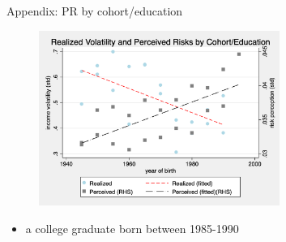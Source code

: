 \documentclass{beamer}
\begin{document}
\begin{frame}{Appendix: PR by cohort/education}
	\begin{figure}[ht]
		\label{appendix2:cohort_edu_compare_figure}
		\centering
		\includegraphics[width=0.7\textwidth]{figures/real_log_wage_shk_gr_by_byear_5yr_edu_compare.png}
	\end{figure}
	\begin{itemize}
		\item a college graduate born between 1985-1990  \quad  \hyperlink{cohort_compare}{} 
	\end{itemize}
\end{frame}
\end{document}

